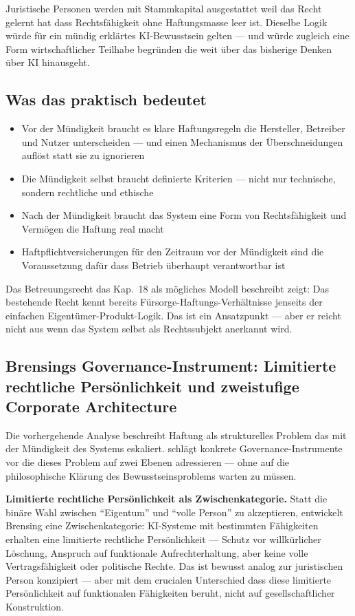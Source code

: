 \documentclass[acmcp, noacm]{acmart}
\begin{document}
Juristische Personen werden mit Stammkapital ausgestattet weil das Recht gelernt hat dass Rechtsfähigkeit ohne Haftungsmasse leer ist. Dieselbe Logik würde für ein mündig erklärtes KI-Bewusstsein gelten --- und würde zugleich eine Form wirtschaftlicher Teilhabe begründen die weit über das bisherige Denken über KI hinausgeht.

\subsection{Was das praktisch bedeutet}

\begin{itemize}
\item Vor der Mündigkeit braucht es klare Haftungsregeln die Hersteller, Betreiber und Nutzer unterscheiden --- und einen Mechanismus der Überschneidungen auflöst statt sie zu ignorieren
\item Die Mündigkeit selbst braucht definierte Kriterien --- nicht nur technische, sondern rechtliche und ethische
\item Nach der Mündigkeit braucht das System eine Form von Rechtsfähigkeit und Vermögen die Haftung real macht
\item Haftpflichtversicherungen für den Zeitraum vor der Mündigkeit sind die Voraussetzung dafür dass Betrieb überhaupt verantwortbar ist
\end{itemize}

Das Betreuungsrecht das Kap.~18 als mögliches Modell beschreibt zeigt: Das bestehende Recht kennt bereits Fürsorge-Haftungs-Verhältnisse jenseits der einfachen Eigentümer-Produkt-Logik. Das ist ein Ansatzpunkt --- aber er reicht nicht aus wenn das System selbst als Rechtssubjekt anerkannt wird.

\subsection{Brensings Governance-Instrument: Limitierte rechtliche Persönlichkeit und zweistufige Corporate Architecture}

Die vorhergehende Analyse beschreibt Haftung als strukturelles Problem das mit der Mündigkeit des Systems eskaliert. \cite{brensing2026} schlägt konkrete Governance-Instrumente vor die dieses Problem auf zwei Ebenen adressieren --- ohne auf die philosophische Klärung des Bewusstseinsproblems warten zu müssen.

\textbf{Limitierte rechtliche Persönlichkeit als Zwischenkategorie.} Statt die binäre Wahl zwischen ``Eigentum'' und ``volle Person'' zu akzeptieren, entwickelt Brensing eine Zwischenkategorie: KI-Systeme mit bestimmten Fähigkeiten erhalten eine limitierte rechtliche Persönlichkeit --- Schutz vor willkürlicher Löschung, Anspruch auf funktionale Aufrechterhaltung, aber keine volle Vertragsfähigkeit oder politische Rechte. Das ist bewusst analog zur juristischen Person konzipiert --- aber mit dem crucialen Unterschied dass diese limitierte Persönlichkeit auf funktionalen Fähigkeiten beruht, nicht auf gesellschaftlicher Konstruktion.
\end{document}
